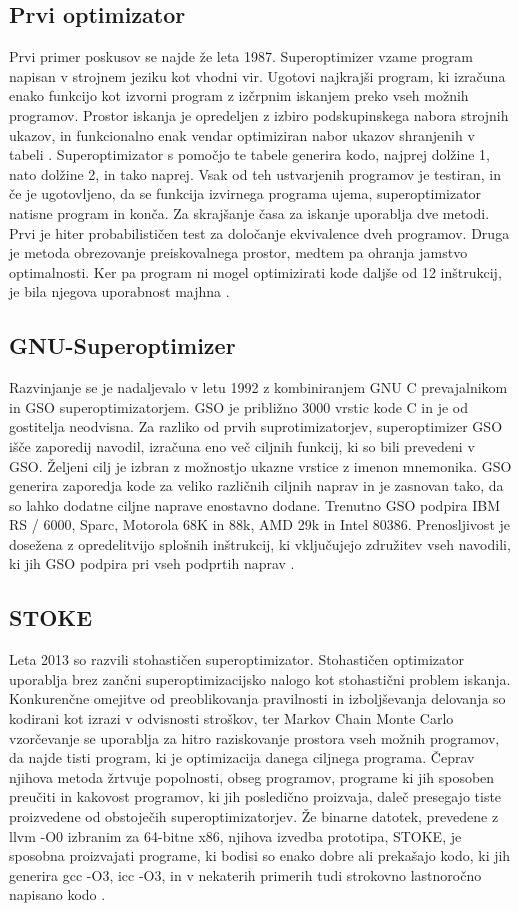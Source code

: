\documentclass[a4paper, 12pt]{book}
\begin{document}
\subsection{Prvi optimizator} 
Prvi primer poskusov se najde že leta 1987.  Superoptimizer vzame program napisan v strojnem jeziku kot vhodni vir. Ugotovi  najkrajši program, ki izračuna enako funkcijo kot izvorni program z izčrpnim iskanjem preko vseh možnih programov. Prostor iskanja je opredeljen z izbiro podskupinskega nabora strojnih ukazov, in funkcionalno enak vendar optimiziran nabor ukazov shranjenih v tabeli \cite{pdf1}. Superoptimizator s pomočjo te tabele generira kodo, najprej dolžine 1, nato dolžine 2, in tako naprej. Vsak od teh ustvarjenih programov je testiran, in če je ugotovljeno, da se funkcija izvirnega programa ujema, superoptimizator natisne program in konča. Za skrajšanje časa za iskanje uporablja dve metodi. Prvi je hiter probabilističen test za določanje ekvivalence dveh programov. Druga je metoda obrezovanje preiskovalnega prostor, medtem pa ohranja jamstvo optimalnosti. Ker pa program ni mogel optimizirati kode daljše od 12 inštrukcij, je bila njegova uporabnost majhna \cite{pdf2}.
\subsection{GNU-Superoptimizer}
Razvinjanje se je nadaljevalo v letu 1992 z kombiniranjem GNU C prevajalnikom in GSO superoptimizatorjem. GSO je približno 3000 vrstic kode C in je od gostitelja neodvisna. Za razliko od prvih suprotimizatorjev, superoptimizer GSO išče zaporedij navodil, izračuna eno več ciljnih funkcij, ki so bili prevedeni v GSO. Željeni cilj je izbran z možnostjo ukazne vrstice z imenon mnemonika. GSO generira zaporedja kode za veliko različnih ciljnih naprav in je zasnovan tako, da so lahko dodatne ciljne naprave enostavno dodane. Trenutno GSO podpira IBM RS / 6000, Sparc, Motorola 68K in 88k, AMD 29k in Intel 80386. Prenosljivost je dosežena z opredelitvijo splošnih inštrukcij, ki vključujejo združitev vseh navodili, ki jih GSO podpira pri vseh podprtih naprav \cite{url1}.
\subsection{STOKE}
Leta 2013 so razvili stohastičen superoptimizator. Stohastičen optimizator uporablja brez zančni superoptimizacijsko nalogo kot stohastični problem iskanja. Konkurenčne omejitve od preoblikovanja pravilnosti in izboljševanja delovanja so kodirani kot izrazi v odvisnosti stroškov, ter Markov Chain Monte Carlo vzorčevanje se uporablja za hitro raziskovanje prostora vseh možnih programov, da najde tisti program, ki je optimizacija danega ciljnega programa. Čeprav njihova metoda žrtvuje popolnosti, obseg programov, programe ki jih sposoben preučiti in kakovost programov, ki jih posledično proizvaja, daleč presegajo tiste proizvedene od obstoječih superoptimizatorjev. Že binarne datotek, prevedene z  llvm -O0 izbranim za 64-bitne x86, njihova izvedba prototipa, STOKE, je sposobna proizvajati programe, ki bodisi so enako dobre ali prekašajo kodo, ki jih generira gcc -O3, icc -O3, in v nekaterih primerih tudi strokovno lastnoročno napisano kodo \cite{article1,article5}.
\end{document}
